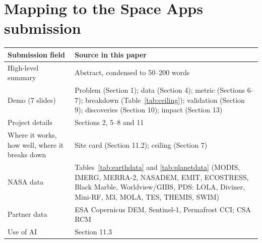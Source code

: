 \documentclass[11pt,a4paper]{article}
\begin{document}



\appendix
\section{Mapping to the Space Apps submission}
\begin{table}[htbp]
\centering
\small
\begin{tabular}{p{4.5cm}p{10.5cm}}
\toprule
Submission field & Source in this paper \\
\midrule
High-level summary & Abstract, condensed to 50--200 words \\
Demo (7 slides) & Problem (Section 1); data (Section 4); metric (Sections 6--7); breakdown (Table~\ref{tab:ceiling}); validation (Section 9); discoveries (Section 10); impact (Section 13) \\
Project details & Sections 2, 5--8 and 11 \\
Where it works, how well, where it breaks down & Site card (Section 11.2); ceiling (Section 7) \\
NASA data & Tables~\ref{tab:earthdata} and \ref{tab:planetdata} (MODIS, IMERG, MERRA-2, NASADEM, EMIT, ECOSTRESS, Black Marble, Worldview/GIBS, PDS: LOLA, Diviner, Mini-RF, M3, MOLA, TES, THEMIS, SWIM) \\
Partner data & ESA Copernicus DEM, Sentinel-1, Permafrost CCI; CSA RCM \\
Use of AI & Section 11.3 \\
\bottomrule
\end{tabular}
\end{table}
\end{document}
